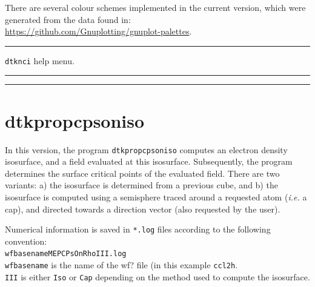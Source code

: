 There are several colour schemes implemented in the current version,
which were generated from the data found in:\\
\url{https://github.com/Gnuplotting/gnuplot-palettes}.


\rule{\textwidth}{1pt}
{\center\texttt{dtknci} help menu.\\}
\rule{\textwidth}{1pt}
\begin{footnotesize}
\end{footnotesize}
\rule{\textwidth}{1pt}

\newpage
\section{\label{sec:dtkpropcpsoniso}dtkpropcpsoniso}

In this version, the program \texttt{dtkpropcpsoniso} computes an electron density isosurface,
and a field evaluated at this isosurface. Subsequently, the program determines the surface
critical points of the evaluated field. There are two variants: a) the isosurface is
determined from a previous cube, and b) the isosurface is computed using a semisphere traced
around a requested atom (\textit{i.e.} a cap), and directed towards a direction vector
(also requested by the user).


Numerical information is saved in \texttt{*.log} files according to the
following convention:\\
\texttt{wfbasename{\color{blue}MEPCPsOnRho}{\color{red}III}.log}\\
\texttt{wfbasename} is the name of the wf? file (in this example \texttt{ccl2h}.\\
\texttt{\color{red}III} is either \texttt{Iso} or \texttt{Cap} depending on the method
used to compute the isosurface.

